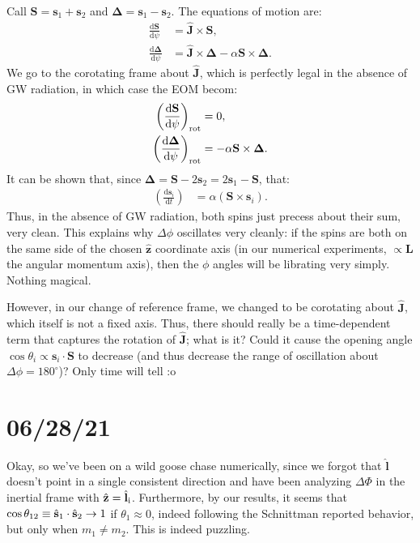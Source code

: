 \documentclass[11pt,
        usenames, %
        dvipsnames %
    ]{article}
\newcommand*{\rd}[2]{\frac{\mathrm{d}#1}{\mathrm{d}#2}}
\newcommand*{\bm}[1]{\boldsymbol{\mathbf{#1}}}
\newcommand*{\uv}[1]{\hat{\bm{#1}}}
\newcommand*{\p}[1]{\left(#1\right)}
\begin{document}
Call $\bm{S} = \bm{s}_1 + \bm{s}_2$ and $\bm{\Delta} = \bm{s}_1 - \bm{s}_2$. The
equations of motion are:
\begin{align}
    \rd{\bm{S}}{\psi} &= \uv{J} \times \bm{S},\\
    \rd{\bm{\Delta}}{\psi} &= \uv{J} \times \bm{\Delta}
        - \alpha \bm{S} \times \bm{\Delta}.
\end{align}
We go to the corotating frame about $\uv{J}$, which is perfectly legal in the
absence of GW radiation, in which case the EOM becom:
\begin{align}
    \p{\rd{\bm{S}}{\psi}}_{\rm rot} &= 0,\\
    \p{\rd{\bm{\Delta}}{\psi}}_{\rm rot} &= - \alpha \bm{S} \times \bm{\Delta}.
\end{align}
It can be shown that, since $\bm{\Delta} = \bm{S} - 2\bm{s}_2 = 2\bm{s}_1 -
\bm{S}$, that:
\begin{align}
    \p{\rd{\bm{s}_i}{t}} &= \alpha\p{\bm{S} \times \bm{s}_i}.
\end{align}
Thus, in the absence of GW radiation, both spins just precess about their sum,
very clean. This explains why $\Delta \phi$ oscillates very cleanly: if the
spins are both on the same side of the chosen $\uv{z}$ coordinate axis (in our
numerical experiments, $\propto \bm{L}$ the angular momentum axis), then the
$\phi$ angles will be librating very simply. Nothing magical.

However, in our change of reference frame, we changed to be corotating about
$\uv{J}$, which itself is not a fixed axis. Thus, there should really be a
time-dependent term that captures the rotation of $\uv{J}$; what is it? Could it
cause the opening angle $\cos \theta_{i} \propto \bm{s}_i \cdot \bm{S}$ to
decrease (and thus decrease the range of oscillation about $\Delta \phi =
180^\circ$)? Only time will tell :o

\section{06/28/21}

Okay, so we've been on a wild goose chase numerically, since we forgot that
$\uv{l}$ doesn't point in a single consistent direction and have been analyzing
$\Delta \Phi$ in the inertial frame with $\uv{z} = \uv{l}_{\rm i}$. Furthermore,
by our results, it seems that $\cos \theta_{\rm 12} \equiv \uv{s}_1 \cdot
\uv{s}_2 \to 1$ if $\theta_1 \approx 0$, indeed following the Schnittman
reported behavior, but only when $m_1 \neq m_2$. This is indeed puzzling.
\end{document}
